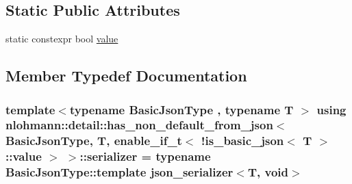 \subsection*{Static Public Attributes}
\begin{DoxyCompactItemize}
\item 
static constexpr bool \hyperlink{structnlohmann_1_1detail_1_1has__non__default__from__json_3_01BasicJsonType_00_01T_00_01enable__b7a8cd863889b54d1139b207b4233111_a5d5bc2b9f1c107696d64d92cf6b5d0d7}{value}
\end{DoxyCompactItemize}


\subsection{Member Typedef Documentation}
\subsubsection[{\texorpdfstring{serializer}{serializer}}]{\setlength{\rightskip}{0pt plus 5cm}template$<$typename Basic\+Json\+Type , typename T $>$ using {\bf nlohmann\+::detail\+::has\+\_\+non\+\_\+default\+\_\+from\+\_\+json}$<$ Basic\+Json\+Type, T, {\bf enable\+\_\+if\+\_\+t}$<$ !{\bf is\+\_\+basic\+\_\+json}$<$ T $>$\+::{\bf value} $>$ $>$\+::{\bf serializer} =  typename Basic\+Json\+Type\+::template json\+\_\+serializer$<$T, {\bf void}$>$}\hypertarget{structnlohmann_1_1detail_1_1has__non__default__from__json_3_01BasicJsonType_00_01T_00_01enable__b7a8cd863889b54d1139b207b4233111_a4bcee5e52902d3011df08cf0233e5e10}{}\label{structnlohmann_1_1detail_1_1has__non__default__from__json_3_01BasicJsonType_00_01T_00_01enable__b7a8cd863889b54d1139b207b4233111_a4bcee5e52902d3011df08cf0233e5e10}


